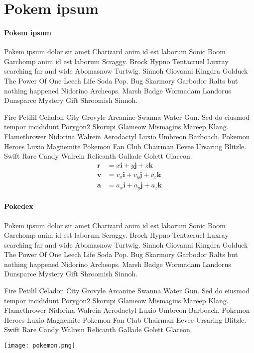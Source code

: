 \section[Pokem ipsum]{Pokem ipsum}

\paragraph{Pokem ipsum}


Pokem ipsum dolor sit amet Charizard anim id est laborum Sonic Boom Garchomp anim id est laborum Scraggy. Brock Hypno Tentacruel Luxray searching far and wide Abomasnow Turtwig. Sinnoh Giovanni Kingdra Golduck The Power Of One Leech Life Soda Pop. Bug Skarmory Garbodor Ralts but nothing happened Nidorino Archeops. Marsh Badge Wormadam Landorus Dunsparce Mystery Gift Shroomish Sinnoh.

Fire Petilil Celadon City Grovyle Arcanine Swanna Water Gun. Sed do eiusmod tempor incididunt Porygon2 Skorupi Glameow Mismagius Mareep Klang. Flamethrower Nidorina Walrein Aerodactyl Luxio Umbreon Barboach. Pokemon Heroes Luxio Magnemite Pokemon Fan Club Chairman Eevee Ursaring Blitzle. Swift Rare Candy Walrein Relicanth Gallade Golett Glaceon. 
%
\begin{align}
\bm r &= x\bm i + y \bm j + z \bm k
\\
\bm v &= v_x\bm i + v_y \bm j + v_z \bm k
\\
\bm a &= a_x\bm i + a_y \bm j + a_z \bm k
\end{align}
%
 
\paragraph{Pokedex}

Pokem ipsum dolor sit amet Charizard anim id est laborum Sonic Boom Garchomp anim id est laborum Scraggy. Brock Hypno Tentacruel Luxray searching far and wide Abomasnow Turtwig. Sinnoh Giovanni Kingdra Golduck The Power Of One Leech Life Soda Pop. Bug Skarmory Garbodor Ralts but nothing happened Nidorino Archeops. Marsh Badge Wormadam Landorus Dunsparce Mystery Gift Shroomish Sinnoh.

Fire Petilil Celadon City Grovyle Arcanine Swanna Water Gun. Sed do eiusmod tempor incididunt Porygon2 Skorupi Glameow Mismagius Mareep Klang. Flamethrower Nidorina Walrein Aerodactyl Luxio Umbreon Barboach. Pokemon Heroes Luxio Magnemite Pokemon Fan Club Chairman Eevee Ursaring Blitzle. Swift Rare Candy Walrein Relicanth Gallade Golett Glaceon. 

\begin{center}
\texttt{[image: pokemon.png]}
\end{center}




